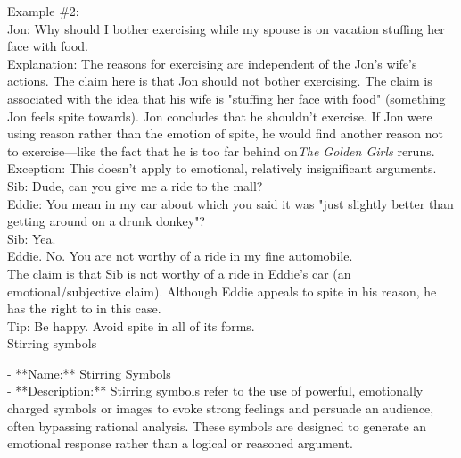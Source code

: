 \documentclass[a4paper,12pt,single,pdftex]{scrbook}
\begin{document}
    
      Example \#2:
    \\

    
      Jon: Why should I bother exercising while my spouse is on vacation stuffing her face with food.
    \\

    
      Explanation: The reasons for exercising are independent of the Jon's wife's actions. The claim here is that Jon should not bother exercising. The claim is associated with the idea that his wife is "stuffing her face with food" (something Jon feels spite towards). Jon concludes that he shouldn't exercise. If Jon were using reason rather than the emotion of spite, he would find another reason not to exercise—like the fact that he is too far behind on{\it  The Golden Girls}  reruns.
    \\

    
      Exception: This doesn't apply to emotional, relatively insignificant arguments.
    \\

    
      Sib: Dude, can you give me a ride to the mall?
    \\

    
      Eddie: You mean in my car about which you said it was "just slightly better than getting around on a drunk donkey"?
    \\

    
      Sib: Yea.
    \\

    
      Eddie. No. You are not worthy of a ride in my fine automobile.
    \\

    
      The claim is that Sib is not worthy of a ride in Eddie's car (an emotional/subjective claim). Although Eddie appeals to spite in his reason, he has the right to in this case.
    \\

    
      Tip: Be happy. Avoid spite in all of its forms.
    \\

  

Stirring symbols
    
      - **Name:** Stirring Symbols
    \\

    
      - **Description:** Stirring symbols refer to the use of powerful, emotionally charged symbols or images to evoke strong feelings and persuade an audience, often bypassing rational analysis. These symbols are designed to generate an emotional response rather than a logical or reasoned argument.
    \\
\end{document}
